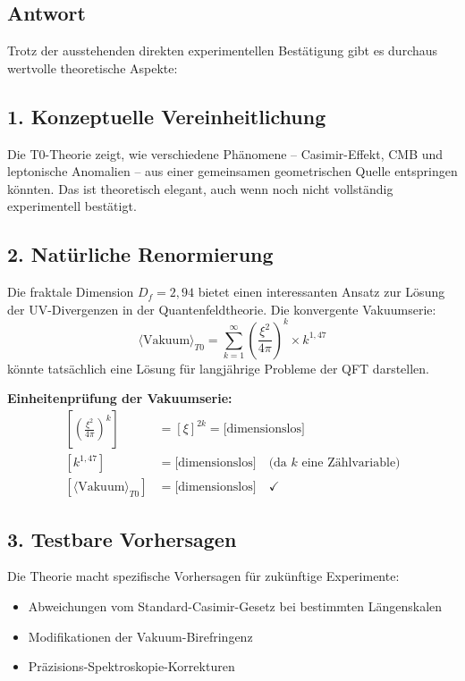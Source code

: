\documentclass[12pt,a4paper]{article}
\theoremstyle{remark}
\newenvironment{answer}{\subsection*{Antwort}}{\vspace{1em}}
\begin{document}
\begin{answer}
	Trotz der ausstehenden direkten experimentellen Bestätigung gibt es durchaus wertvolle theoretische Aspekte:
	
	\subsection{1. Konzeptuelle Vereinheitlichung}
	
	Die T0-Theorie zeigt, wie verschiedene Phänomene -- Casimir-Effekt, CMB und leptonische Anomalien -- aus einer gemeinsamen geometrischen Quelle entspringen könnten. Das ist theoretisch elegant, auch wenn noch nicht vollständig experimentell bestätigt.
	
	\subsection{2. Natürliche Renormierung}
	
	Die fraktale Dimension $D_f = 2{,}94$ bietet einen interessanten Ansatz zur Lösung der UV-Divergenzen in der Quantenfeldtheorie. Die konvergente Vakuumserie:
	\begin{equation}
		\langle \text{Vakuum} \rangle_{T0} = \sum_{k=1}^{\infty} \left(\frac{\xi^2}{4\pi}\right)^k \times k^{1{,}47}
	\end{equation}
	könnte tatsächlich eine Lösung für langjährige Probleme der QFT darstellen.
	
	\begin{units}
		\textbf{Einheitenprüfung der Vakuumserie:}
		\begin{align}
			\left[\left(\frac{\xi^2}{4\pi}\right)^k\right] &= [\xi]^{2k} = \text{[dimensionslos]} \\
			[k^{1{,}47}] &= \text{[dimensionslos]} \quad \text{(da } k \text{ eine Zählvariable)} \\
			[\langle \text{Vakuum} \rangle_{T0}] &= \text{[dimensionslos]} \quad \checkmark
		\end{align}
	\end{units}
	
	\subsection{3. Testbare Vorhersagen}
	
	Die Theorie macht spezifische Vorhersagen für zukünftige Experimente:
	\begin{itemize}
		\item Abweichungen vom Standard-Casimir-Gesetz bei bestimmten Längenskalen
		\item Modifikationen der Vakuum-Birefringenz
		\item Präzisions-Spektroskopie-Korrekturen
	\end{itemize}
	

\end{answer}
\end{document}
